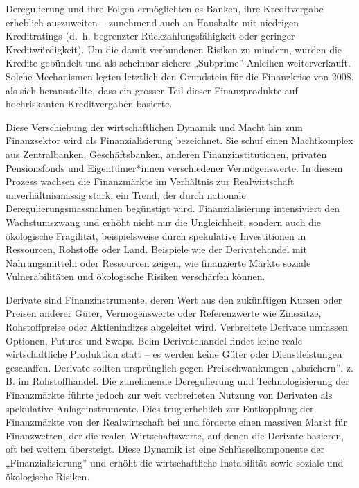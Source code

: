 \documentclass[
  nswissgerman,
  a4paper,
  DIV=11,
  numbers=noendperiod,
  oneside,
  openany]{scrreprt}
\begin{document}
Deregulierung und ihre Folgen ermöglichten es Banken, ihre Kreditvergabe
erheblich auszuweiten -- zunehmend auch an Haushalte mit niedrigen
Kreditratings (d.~h. begrenzter Rückzahlungsfähigkeit oder geringer
Kreditwürdigkeit). Um die damit verbundenen Risiken zu mindern, wurden
die Kredite gebündelt und als scheinbar sichere „Subprime''-Anleihen
weiterverkauft. Solche Mechanismen legten letztlich den Grundstein für
die Finanzkrise von 2008, als sich herausstellte, dass ein grosser Teil
dieser Finanzprodukte auf hochriskanten Kreditvergaben basierte.

Diese Verschiebung der wirtschaftlichen Dynamik und Macht hin zum
Finanzsektor wird als Finanzialisierung bezeichnet. Sie schuf einen
Machtkomplex aus Zentralbanken, Geschäftsbanken, anderen
Finanzinstitutionen, privaten Pensionsfonds und Eigentümer*innen
verschiedener Vermögenswerte. In diesem Prozess wachsen die Finanzmärkte
im Verhältnis zur Realwirtschaft unverhältnismässig stark, ein Trend,
der durch nationale Deregulierungsmassnahmen begünstigt wird.
Finanzialisierung intensiviert den Wachstumszwang und erhöht nicht nur
die Ungleichheit, sondern auch die ökologische Fragilität,
beispielsweise durch spekulative Investitionen in Ressourcen, Rohstoffe
oder Land. Beispiele wie der Derivatehandel mit Nahrungsmitteln oder
Ressourcen zeigen, wie finanzierte Märkte soziale Vulnerabilitäten und
ökologische Risiken verschärfen können.

\begin{tcolorbox}[enhanced jigsaw, arc=.35mm, bottomrule=.15mm, bottomtitle=1mm, breakable, colback=white, colbacktitle=quarto-callout-note-color!10!white, colframe=quarto-callout-note-color-frame, coltitle=black, left=2mm, leftrule=.75mm, opacityback=0, opacitybacktitle=0.6, rightrule=.15mm, title={Was sind Derivate und wie tragen sie zur Finanzialisierung bei?}, titlerule=0mm, toprule=.15mm, toptitle=1mm]

Derivate sind Finanzinstrumente, deren Wert aus den zukünftigen Kursen
oder Preisen anderer Güter, Vermögenswerte oder Referenzwerte wie
Zinssätze, Rohstoffpreise oder Aktienindizes abgeleitet wird.
Verbreitete Derivate umfassen Optionen, Futures und Swaps. Beim
Derivatehandel findet keine reale wirtschaftliche Produktion statt -- es
werden keine Güter oder Dienstleistungen geschaffen. Derivate sollten
ursprünglich gegen Preisschwankungen „absichern'', z. B. im
Rohstoffhandel. Die zunehmende Deregulierung und Technologisierung der
Finanzmärkte führte jedoch zur weit verbreiteten Nutzung von Derivaten
als spekulative Anlageinstrumente. Dies trug erheblich zur Entkopplung
der Finanzmärkte von der Realwirtschaft bei und förderte einen massiven
Markt für Finanzwetten, der die realen Wirtschaftswerte, auf denen die
Derivate basieren, oft bei weitem übersteigt. Diese Dynamik ist eine
Schlüsselkomponente der „Finanzialisierung'' und erhöht die
wirtschaftliche Instabilität sowie soziale und ökologische Risiken.

\end{tcolorbox}
\end{document}
